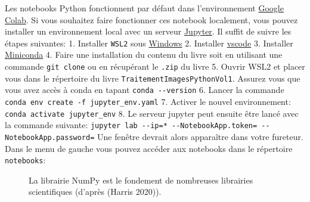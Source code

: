 \documentclass[
  11pt,
  letterpaper,
  open=any,
  twoside=false,
  french]{scrbook}
\begin{document}
Les notebooks Python fonctionnent par défaut dans l'environnement
\href{https://colab.google/}{Google Colab}. Si vous souhaitez faire
fonctionner ces notebook localement, vous pouvez installer un
environnement local avec un serveur
\href{https://jupyterlab.readthedocs.io/en/stable/getting_started/starting.html}{Jupyter}.
Il suffit de suivre les étapes suivantes: 1. Installer \texttt{WSL2}
sous
\href{https://learn.microsoft.com/en-us/windows/wsl/install}{Windows} 2.
Installer
\href{https://code.visualstudio.com/docs/setup/windows}{vscode} 3.
Installer
\href{https://docs.anaconda.com/miniconda/install/\#quick-command-line-install}{Miniconda}
4. Faire une installation du contenu du livre soit en utilisant une
commande \texttt{git\ clone} ou en récupérant le \texttt{.zip} du livre
5. Ouvrir WSL2 et placer vous dans le répertoire du livre
\texttt{TraitementImagesPythonVol1}. Assurez vous que vous avez accès à
conda en tapant \texttt{conda\ -\/-version} 6. Lancer la commande
\texttt{conda\ env\ create\ -f\ jupyter\_env.yaml} 7. Activer le nouvel
environnement: \texttt{conda\ activate\ jupyter\_env} 8. Le serveur
jupyter peut ensuite être lancé avec la commande suivante:
\texttt{jupyter\ lab\ -\/-ip=\textquotesingle{}*\textquotesingle{}\ -\/-NotebookApp.token=\textquotesingle{}\textquotesingle{}\ -\/-NotebookApp.password=\textquotesingle{}\textquotesingle{}}
Une fenêtre devrait alors apparaître dans votre fureteur. Dans le menu
de gauche vous pouvez accéder aux notebooks dans le répertoire
\texttt{notebooks}:

\begin{figure}


\caption[Client Jupyter Lab]{\label{fig-jupyterlab}La librairie NumPy
est le fondement de nombreuses librairies scientifiques (d'après (Harris
2020)).}

\end{figure}%
\end{document}
